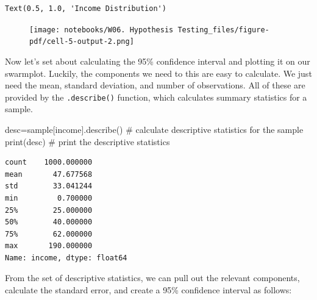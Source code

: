 \documentclass[
  letterpaper,
  DIV=11,
  numbers=noendperiod]{scrreprt}
\newenvironment{Shaded}{\begin{snugshade}}{\end{snugshade}}
\newcommand{\BuiltInTok}[1]{\textcolor[rgb]{0.00,0.23,0.31}{#1}}
\newcommand{\CommentTok}[1]{\textcolor[rgb]{0.37,0.37,0.37}{#1}}
\newcommand{\NormalTok}[1]{\textcolor[rgb]{0.00,0.23,0.31}{#1}}
\newcommand{\OperatorTok}[1]{\textcolor[rgb]{0.37,0.37,0.37}{#1}}
\newcommand{\StringTok}[1]{\textcolor[rgb]{0.13,0.47,0.30}{#1}}
\begin{document}
\begin{verbatim}
Text(0.5, 1.0, 'Income Distribution')
\end{verbatim}

\begin{figure}[H]

{\centering \texttt{[image: notebooks/W06. Hypothesis Testing\_files/figure-pdf/cell-5-output-2.png]}

}

\end{figure}

Now let's set about calculating the 95\% confidence interval and
plotting it on our swarmplot. Luckily, the components we need to this
are easy to calculate. We just need the mean, standard deviation, and
number of observations. All of these are provided by the
\texttt{.describe()} function, which calculates summary statistics for a
sample.

\begin{Shaded}
\begin{Highlighting}[]
\NormalTok{desc}\OperatorTok{=}\NormalTok{sample[}\StringTok{\textquotesingle{}income\textquotesingle{}}\NormalTok{].describe() }\CommentTok{\# calculate descriptive statistics for the sample}
\BuiltInTok{print}\NormalTok{(desc) }\CommentTok{\# print the descriptive statistics}
\end{Highlighting}
\end{Shaded}

\begin{verbatim}
count    1000.000000
mean       47.677568
std        33.041244
min         0.700000
25%        25.000000
50%        40.000000
75%        62.000000
max       190.000000
Name: income, dtype: float64
\end{verbatim}

From the set of descriptive statistics, we can pull out the relevant
components, calculate the standard error, and create a 95\% confidence
interval as follows:
\end{document}
